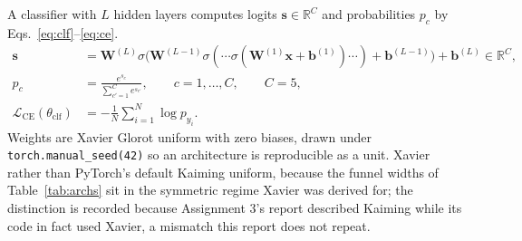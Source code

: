 \documentclass[11pt,a4paper]{article}
\newcommand{\R}{\mathbb{R}}\newcommand{\given}{\mid}\newcommand{\Acc}{\mathrm{Acc}}
\newcommand{\code}[1]{\texttt{#1}}
\begin{document}
A classifier with $L$ hidden layers computes logits $\mathbf{s}\in\R^{C}$ and probabilities $p_c$
by Eqs.~\eqref{eq:clf}--\eqref{eq:ce}.
\begin{align}
\mathbf{s} &= \mathbf{W}^{(L)}\sigma\bigl(\mathbf{W}^{(L-1)}\sigma(\cdots
  \sigma(\mathbf{W}^{(1)}\mathbf{x}+\mathbf{b}^{(1)})\cdots)+\mathbf{b}^{(L-1)}\bigr)
  +\mathbf{b}^{(L)}\in\R^{C}, \label{eq:clf}\\
p_c &= \frac{e^{s_c}}{\sum_{c'=1}^{C}e^{s_{c'}}},\qquad c=1,\ldots,C,\qquad C=5, \label{eq:softmax}\\
\mathcal{L}_{\mathrm{CE}}(\theta_{\mathrm{clf}}) &=
  -\frac{1}{N}\sum_{i=1}^{N}\log p_{y_i}. \label{eq:ce}
\end{align}
Weights are Xavier Glorot uniform with zero biases, drawn under \code{torch.manual\_seed(42)} so
an architecture is reproducible as a unit.  Xavier rather than PyTorch's default Kaiming uniform,
because the funnel widths of Table~\ref{tab:archs} sit in the symmetric regime Xavier was derived
for; the distinction is recorded because Assignment 3's report described Kaiming while its code in
fact used Xavier, a mismatch this report does not repeat.
\end{document}
